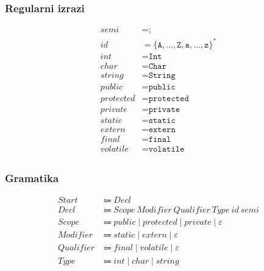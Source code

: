 \documentclass{report}
\newcommand{\Null}{\varepsilon}
\newcommand{\Char}[1]{\texttt{#1}}
\newcommand{\Spc}{\ }
\newcommand{\Union}{\mathrel{|}}
\newcommand{\Kleene}[1]{{#1}^\ast}
\newcommand{\Arrow}{\Coloneq}
\newcommand{\NT}[1]{{#1}}
\newcommand{\T}[1]{{#1}}
\begin{document}
\subsubsection*{Regularni izrazi}
\begin{equation*}
  \begin{aligned}
    \T{semi} &= \Char{;}\\
    \T{id} &= \Kleene{\{\Char{A}, \dots, \Char{Z}, \Char{a}, \dots, \Char{z}\}}\\
    \T{int} &= \Char{Int}\\
    \T{char} &= \Char{Char}\\
    \T{string} &= \Char{String}\\
    \T{public} &= \Char{public}\\
    \T{protected} &= \Char{protected}\\
    \T{private} &= \Char{private}\\
    \T{static} &= \Char{static}\\
    \T{extern} &= \Char{extern}\\
    \T{final} &= \Char{final}\\
    \T{volatile} &= \Char{volatile}\\
  \end{aligned}
\end{equation*}

\subsubsection*{Gramatika}
\begin{equation*}
  \begin{aligned}
    \NT{Start} &\Arrow \NT{Decl}\\
    \NT{Decl} &\Arrow \NT{Scope} \Spc \NT{Modifier} \Spc \NT{Qualifier} \Spc \NT{Type} \Spc \T{id} \Spc \T{semi}\\
    \NT{Scope} &\Arrow \T{public} \Union \T{protected} \Union \T{private} \Union \Null\\
    \NT{Modifier} &\Arrow \T{static} \Union \T{extern} \Union \Null\\
    \NT{Qualifier} &\Arrow \T{final} \Union \T{volatile} \Union \Null\\
    \NT{Type} &\Arrow \T{int} \Union \T{char} \Union \T{string}\\
  \end{aligned}
\end{equation*}
\end{document}

